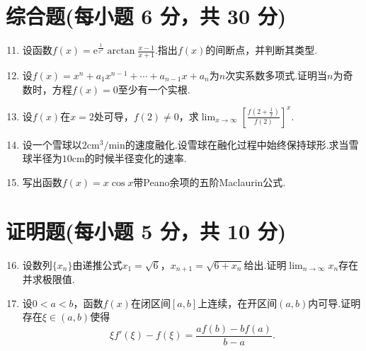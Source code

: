 \documentclass[../Main.tex]{subfiles}
\begin{document}
\section{综合题(每小题 6 分，共 30 分)}
\begin{enumerate}
    \setcounter{enumi}{10}
    \item 设函数$f(x)=\mathrm{e}^{\frac{1}{x^{2}}}\arctan\frac{x-1}{x+1}$.指出$f
              (x)$的间断点，并判断其类型.
          \vspace{8em}

    \item 设$f(x)=x^{n}+a_{1} x^{n-1}+\cdots+a_{n-1}x+a_{n}$为$n$次实系数多项式.证明当$n$为奇数时，方程$f
              (x)=0$至少有一个实根.
          \vspace{8em}

    \item 设$f(x)$在$x=2$处可导，$f(2)\neq0$，求$\lim_{x\to\infty}\left[\frac{f\left(2+\frac{1}{x}\right)}{f(2)}
                  \right]^{x}$.
          \vspace{9em}

    \item 设一个雪球以$2\mathrm{cm}^{3}/\mathrm{min}$的速度融化.设雪球在融化过程中始终保持球形.求当雪球半径为$1
              0\mathrm{cm}$的时候半径变化的速率.
          \vspace{10em}

    \item 写出函数$f(x)=x\cos x$带Peano余项的五阶Maclaurin公式.
          \vspace{12em}
\end{enumerate}

\section{证明题(每小题 5 分，共 10 分)}
\begin{enumerate}
    \setcounter{enumi}{15}
    \item 设数列$\{x_{n}\}$由递推公式$x_{1}=\sqrt{6}$，$x_{n+1}=\sqrt{6+x_{n}}$给出.证明$\lim
              _{n\to\infty}x_{n}$存在并求极限值.
          \vspace{12em}

    \item 设$0<a<b$，函数$f(x)$在闭区间$[a,b]$上连续，在开区间$(a,b)$内可导.证明存在$\xi
              \in(a,b)$使得
          \[
              \xi f'(\xi)-f(\xi)=\frac{af(b)-bf(a)}{b-a}.
          \]
\end{enumerate}
\end{document}
